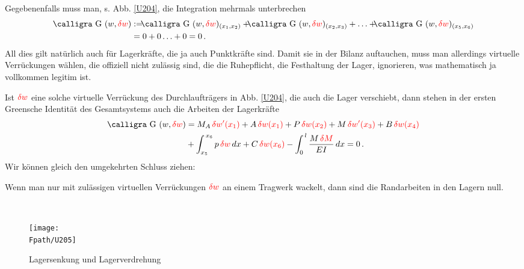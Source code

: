 {{{{Gegebenenfalls muss man, s. Abb. \ref{U204}, die Integration mehrmals unterbrechen
\begin{align}
\text{\normalfont\calligra G\,\,}(w,\textcolor{red}{\delta w}) &:= \!\!\!\text{\normalfont\calligra G\,\,}(w,\textcolor{red}{\delta w})_{(x_1,x_2)} + \!\!\!\text{\normalfont\calligra G\,\,}(w,\textcolor{red}{\delta w})_{(x_2, x_3)} + \ldots + \!\!\!\text{\normalfont\calligra G\,\,}(w,\textcolor{red}{\delta w})_{(x_5,x_6)} \nn \\
&= 0 + 0 \ldots + 0 = 0\,.
\end{align}
All dies gilt nat\"{u}rlich auch f\"{u}r Lagerkr\"{a}fte, die ja auch Punktkr\"{a}fte sind. Damit sie in der Bilanz auftauchen, muss man allerdings virtuelle Verr\"{u}ckungen w\"{a}hlen, die offiziell nicht zul\"{a}ssig sind, die die \glq Ruhepflicht\grq{}, die Festhaltung der Lager, ignorieren, was mathematisch ja vollkommen legitim ist.

Ist $\textcolor{red}{\delta w} $ eine solche virtuelle Verr\"{u}ckung des Durchlauftr\"{a}gers in Abb. \ref{U204}, die auch die Lager verschiebt, dann stehen in der ersten Greensche Identit\"{a}t des Gesamtsystems auch die Arbeiten der Lagerkr\"{a}fte
\begin{align}
\text{\normalfont\calligra G\,\,}(w,\textcolor{red}{\delta w}) &=  M_A\,\textcolor{red}{\delta w'(x_1)}+ A\,\textcolor{red}{\delta w(x_1)} + P\,\textcolor{red}{\delta w(x_2)} + M\,\textcolor{red}{\delta w'(x_3)} + B\,\textcolor{red}{\delta w(x_4)}\nn \\
&+ \int_{x_5}^{\,x_6} p\,\textcolor{red}{\delta w}\,dx + C\,\textcolor{red}{\delta w(x_6)} - \int_0^{\,l} \frac{M\,\textcolor{red}{\delta M }}{EI}\,dx = 0\,.
\end{align}
Wir k\"{o}nnen gleich den umgekehrten Schluss ziehen:\\

\hspace*{-12pt}\colorbox{highlightBlue}{\parbox{0.98\textwidth}{Wenn man nur mit zul\"{a}ssigen virtuellen Verr\"{u}ckungen $\textcolor{red}{\delta w }$ an einem Trag\-werk \glq wackelt\grq{}, dann sind die Randarbeiten in den Lagern  null.}}\\

\begin{figure}[tbp]
\centering
\if {} \sidecaption \fi
\texttt{[image: \\Fpath/U205]}
\caption{Lagersenkung und Lagerverdrehung} \label{U205}
\end{figure}%

}}}}
